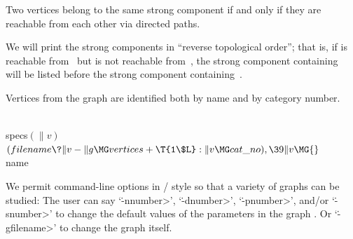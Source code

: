 Two vertices belong to the same strong component if and only if they
are reachable from each other via directed paths.

We will print the strong components in ``reverse topological order'';
that is, if  is reachable from~ but  is not reachable
from~, the strong component containing~ will be listed before
the strong component containing~.

Vertices from the  graph are identified both by name and by
category number.

\Y\B\4\D\\{specs}$(\|v)$\5
$(\\{filename}\?\|v-\|g\MG\\{vertices}+\T{1\$L}:\|v\MG\\{cat\_no}),\39\|v\MG{}$%
\\{name}\par
\fi

We permit command-line options in \UNIX/ style so that a variety of
graphs can be studied:
The user can say `\.{-n}\<number>', `\.{-d}\<number>', `\.{-p}\<number>',
and/or `\.{-s}\<number>' to change the default values of the parameters
in the graph . Or `\.{-g}\<filename>' to
change the
graph itself.

